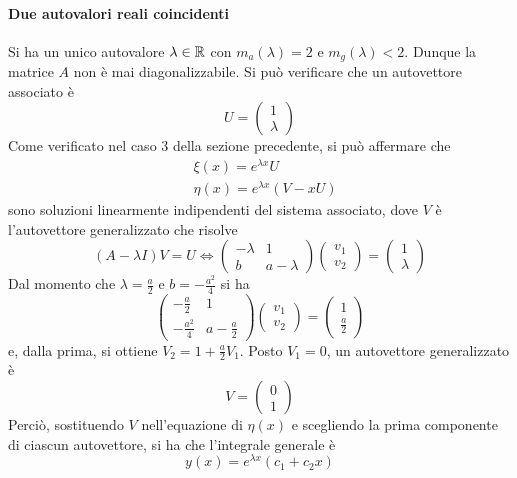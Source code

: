 \paragraph{Due autovalori reali coincidenti}
Si ha un unico autovalore $\lambda \in \mathbb{R}$ con $m_a(\lambda)=2$ e $m_g(\lambda)<2$. Dunque la matrice $A$ non è mai diagonalizzabile. Si può verificare che un autovettore associato è 
\begin{equation*}
    U= \begin{pmatrix}
        1\\
        \lambda
    \end{pmatrix}
\end{equation*}
Come verificato nel caso 3 della sezione precedente, si può affermare che 
\begin{align}
    &\xi(x)=e^{\lambda
    x}U\\
    &\eta(x)=e^{\lambda x}(V-xU)
\end{align}
sono soluzioni linearmente indipendenti del sistema associato, dove $V$ è l'autovettore generalizzato che risolve 
\begin{equation*}
    (A-\lambda I)V=U \iff \begin{pmatrix}
        -\lambda & 1\\
        b & a-\lambda
    \end{pmatrix}
    \begin{pmatrix}
        v_1\\
        v_2
    \end{pmatrix}= \begin{pmatrix}
        1\\
        \lambda
    \end{pmatrix}
\end{equation*}
Dal momento che $\lambda= \tfrac{a}{2}$ e $b=-\tfrac{a^2}{4}$ si ha
\begin{equation*}
    \begin{pmatrix}
        -\frac{a}{2} & 1\\
        -\frac{a^2}{4} & a-\frac{a}{2}
    \end{pmatrix}
    \begin{pmatrix}
        v_1\\
        v_2
    \end{pmatrix}= \begin{pmatrix}
        1\\
        \frac{a}{2}
        \end{pmatrix}
\end{equation*}
e, dalla prima, si ottiene $V_2=1+\tfrac{a}{2}V_1$. Posto $V_1=0$, un autovettore generalizzato è
\begin{equation*}
    V=\begin{pmatrix}
        0\\
        1
    \end{pmatrix}
\end{equation*}
Perciò, sostituendo $V$ nell'equazione di $\eta(x)$ e scegliendo la prima componente di ciascun autovettore, si ha che l'integrale generale è
\begin{equation*}
y(x)= e^{\lambda x}(c_1+c_2 x)    
\end{equation*}
